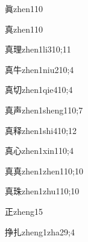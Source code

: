 \begin{verbete}{眞}{zhen1}{10}
\end{verbete}

\begin{verbete}{真}{zhen1}{10}
\end{verbete}

\begin{verbete}{真理}{zhen1li3}{10;11}
\end{verbete}

\begin{verbete}{真牛}{zhen1niu2}{10;4}
\end{verbete}

\begin{verbete}{真切}{zhen1qie4}{10;4}
\end{verbete}

\begin{verbete}{真声}{zhen1sheng1}{10;7}
\end{verbete}

\begin{verbete}{真释}{zhen1shi4}{10;12}
\end{verbete}

\begin{verbete}{真心}{zhen1xin1}{10;4}
\end{verbete}

\begin{verbete}{真真}{zhen1zhen1}{10;10}
\end{verbete}

\begin{verbete}{真珠}{zhen1zhu1}{10;10}
\end{verbete}

\begin{verbete}{正}{zheng1}{5}
\end{verbete}

\begin{verbete}{挣扎}{zheng1zha2}{9;4}
\end{verbete}

